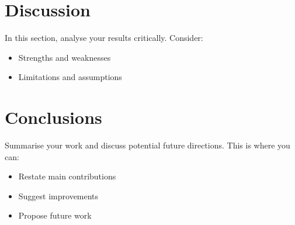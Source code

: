 \documentclass[11pt]{article}
\begin{document}
\begin{multicols}{2}
        \section{Discussion}
        In this section, analyse your results critically. Consider:
        \begin{itemize}
            \item Strengths and weaknesses
            \item Limitations and assumptions
        \end{itemize}

        \section{Conclusions}
        Summarise your work and discuss potential future directions. This is where you can:
        \begin{itemize}
            \item Restate main contributions
            \item Suggest improvements
            \item Propose future work
        \end{itemize}

        
    
    \end{multicols}

    \newpage
    
\end{document}
